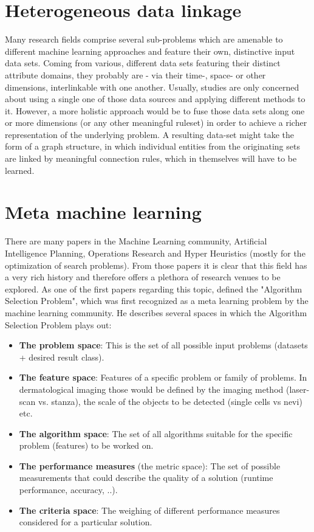 \section{Heterogeneous data linkage}
\label{ssect:heterogeneous_data}

Many research fields comprise several sub-problems which are amenable to different machine learning approaches and feature their own, distinctive input data sets. Coming from various, different data sets featuring their distinct attribute domains, they probably are - via their time-, space- or other dimensions, interlinkable with one another. Usually, studies are only concerned about using a single one of those data sources and applying different methods to it. However, a more holistic approach would be to fuse those data sets along one or more dimensions (or any other meaningful ruleset) in order to achieve a richer representation of the underlying problem. A resulting data-set might take the form of a graph structure, in which individual entities from the originating sets are linked by meaningful connection rules, which in themselves will have to be learned.


\section{Meta machine learning}
\label{sect:meta_ml}

There are many papers in the Machine Learning community, Artificial Intelligence Planning, Operations Research and Hyper Heuristics (mostly for the optimization of search problems). From those papers it is clear that this field has a very rich history and therefore offers a plethora of research venues to be explored. As one of the first papers regarding this topic, \citep{Rice1975} defined the "Algorithm Selection Problem", which was first recognized as a meta learning problem by the machine learning community. He describes several spaces in which the Algorithm Selection Problem plays out:

\begin{itemize}
	\item \textbf{The problem space}: This is the set of all possible input problems (datasets + desired result class).
	
	\item \textbf{The feature space}: Features of a specific problem or family of problems. In dermatological imaging those would be defined by the imaging method (laser-scan vs. stanza), the scale of the objects to be detected (single cells vs nevi) etc.
	
	\item \textbf{The algorithm space}: The set of all algorithms suitable for the specific problem (features) to be worked on.
	
	\item \textbf{The performance measures} (the metric space): The set of possible measurements that could describe the quality of a solution (runtime performance, accuracy, ..).
	
	\item \textbf{The criteria space}: The weighing of different performance measures considered for a particular solution.
\end{itemize}

